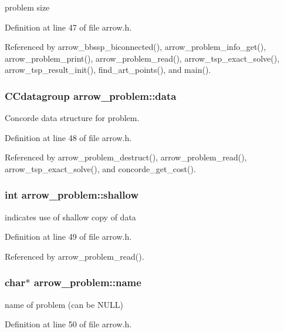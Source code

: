 problem size 

Definition at line 47 of file arrow.h.

Referenced by arrow\_\-bbssp\_\-biconnected(), arrow\_\-problem\_\-info\_\-get(), arrow\_\-problem\_\-print(), arrow\_\-problem\_\-read(), arrow\_\-tsp\_\-exact\_\-solve(), arrow\_\-tsp\_\-result\_\-init(), find\_\-art\_\-points(), and main().\hypertarget{structarrow__problem_5f04fe51bf6438b8f844c8cc06eb5ba0}{
\subsubsection{\setlength{\rightskip}{0pt plus 5cm}CCdatagroup {\bf arrow\_\-problem::data}}}
\label{structarrow__problem_5f04fe51bf6438b8f844c8cc06eb5ba0}


Concorde data structure for problem. 

Definition at line 48 of file arrow.h.

Referenced by arrow\_\-problem\_\-destruct(), arrow\_\-problem\_\-read(), arrow\_\-tsp\_\-exact\_\-solve(), and concorde\_\-get\_\-cost().\hypertarget{structarrow__problem_8c3f4f7794c1430440658d69151b296d}{
\subsubsection{\setlength{\rightskip}{0pt plus 5cm}int {\bf arrow\_\-problem::shallow}}}
\label{structarrow__problem_8c3f4f7794c1430440658d69151b296d}


indicates use of shallow copy of data 

Definition at line 49 of file arrow.h.

Referenced by arrow\_\-problem\_\-read().\hypertarget{structarrow__problem_4463422357e42b021b77b6e166eaf308}{
\subsubsection{\setlength{\rightskip}{0pt plus 5cm}char$\ast$ {\bf arrow\_\-problem::name}}}
\label{structarrow__problem_4463422357e42b021b77b6e166eaf308}


name of problem (can be NULL) 

Definition at line 50 of file arrow.h.

